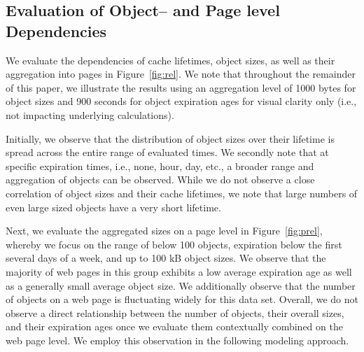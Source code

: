 \subsection{Evaluation of Object-- and Page level Dependencies}
We evaluate the dependencies of cache lifetimes, object sizes, as well as their aggregation into pages in Figure~\ref{fig:rel}.
We note that throughout the remainder of this paper, we illustrate the results using an aggregation level of 1000 bytes for object sizes and 900 seconds for object expiration ages for visual clarity only (i.e., not impacting underlying calculations).

\begin{figure*}[b!]
	\centering
	\hfil
	\caption{Individual sizes and cache expirations for 197634 web objects as well as their averages when considering page--level relationships for 4776 mobile web landing pages.\label{fig:rel}}
\end{figure*}

Initially, we observe that the distribution of object sizes over their lifetime is spread across the entire range of evaluated times. 
We secondly note that at specific expiration times, i.e., none, hour, day, etc., a broader range and aggregation of objects can be observed. 
While we do not observe a close correlation of object sizes and their cache lifetimes, we note that large numbers of even large sized objects have a very short lifetime.

Next, we evaluate the aggregated sizes on a page level in Figure~\ref{fig:prel}, whereby we focus on the range of below 100 objects, expiration below the first several days of a week, and up to 100 kB object sizes.
We observe that the majority of web pages in this group exhibits a low average expiration age as well as a generally small average object size.
We additionally observe that the number of objects on a web page is fluctuating widely for this data set.
Overall, we do not observe a direct relationship between the number of objects, their overall sizes, and their expiration ages once we evaluate them contextually combined on the web page level.
We employ this observation in the following modeling approach.


